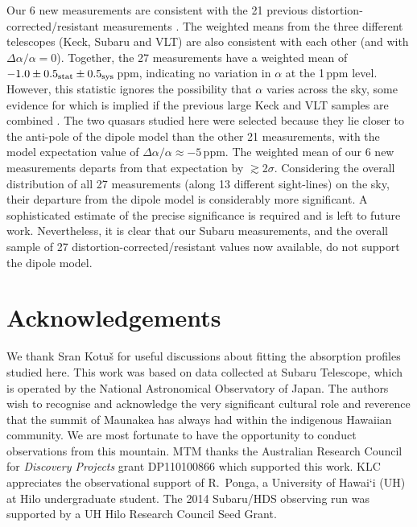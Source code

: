 \documentclass[fleqn,usenatbib,usedcolumn]{mnras}
\renewcommand{\la}{\lesssim} %
\renewcommand{\ga}{\gtrsim} %
\newcommand{\daa}{\ensuremath{\Delta\alpha/\alpha}}
\begin{document}
Our 6 new measurements are consistent with the 21 previous distortion-corrected/resistant measurements \citep{Evans:2014:128,Murphy:2016:2461,Kotus:2017:3679}. The weighted means from the three different telescopes (Keck, Subaru and VLT) are also consistent with each other (and with $\daa=0$). Together, the 27 measurements have a weighted mean of $-1.0\pm0.5_{\rm stat}\pm0.5_{\rm sys}$\,ppm, indicating no variation in $\alpha$ at the 1\,ppm level. However, this statistic ignores the possibility that $\alpha$ varies across the sky, some evidence for which is implied if the previous large Keck and VLT samples are combined \citep[][noting that these measurements are likely to have been significantly affected by long-range distortions, \citealt{Whitmore:2015:446}]{Webb:2011:191101,King:2012:3370}. The two quasars studied here were selected because they lie closer to the anti-pole of the \citet{King:2012:3370} dipole model than the other 21 measurements, with the model expectation value of $\daa\approx-5$\,ppm. The weighted mean of our 6 new measurements departs from that expectation by $\ga$2$\sigma$. Considering the overall distribution of all 27 measurements (along 13 different sight-lines) on the sky, their departure from the dipole model is considerably more significant. A sophisticated estimate of the precise significance is required and is left to future work. Nevertheless, it is clear that our Subaru measurements, and the overall sample of 27 distortion-corrected/resistant values now available, do not support the dipole model.


\section*{Acknowledgements}

We thank Sr\dj{}an Kotu\v{s} for useful discussions about fitting the absorption profiles studied here. This work was based on data collected at Subaru Telescope, which is operated by the National Astronomical Observatory of Japan. The authors wish to recognise and acknowledge the very significant cultural role and reverence that the summit of Maunakea has always had within the indigenous Hawaiian community. We are most fortunate to have the opportunity to conduct observations from this mountain. MTM thanks the Australian Research Council for \textsl{Discovery Projects} grant DP110100866 which supported this work. KLC appreciates the observational support of R.\ Ponga, a University of Hawai`i (UH) at Hilo undergraduate student. The 2014 Subaru/HDS observing run was supported by a UH Hilo Research Council Seed Grant.
\end{document}
